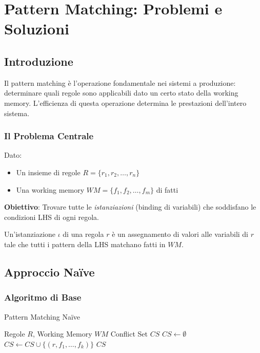 
\chapter{Pattern Matching: Problemi e Soluzioni}
\label{cap:pattern_matching}

\section{Introduzione}

Il pattern matching è l'operazione fondamentale nei sistemi a produzione: determinare quali regole sono applicabili dato un certo stato della working memory. L'efficienza di questa operazione determina le prestazioni dell'intero sistema.

\subsection{Il Problema Centrale}

Dato:
\begin{itemize}
\item Un insieme di regole $R = \{r_1, r_2, \ldots, r_n\}$
\item Una working memory $WM = \{f_1, f_2, \ldots, f_m\}$ di fatti
\end{itemize}

\textbf{Obiettivo}: Trovare tutte le \textit{istanziazioni} (binding di variabili) che soddisfano le condizioni LHS di ogni regola.

\begin{definizione}[Istanziazione]
Un'istanziazione $\iota$ di una regola $r$ è un assegnamento di valori alle variabili di $r$ tale che tutti i pattern della LHS matchano fatti in $WM$.
\end{definizione}

\section{Approccio Naïve}

\subsection{Algoritmo di Base}

\begin{algorithm}
\caption{Pattern Matching Naïve}
\begin{algorithmic}[1]
\Require Regole $R$, Working Memory $WM$
\Ensure Conflict Set $CS$
  \State $CS \gets \emptyset$
        \State $CS \gets CS \cup \{(r, f_1, \ldots, f_k)\}$
      \EndIf
    \EndFor
  \EndFor
  \State \Return $CS$
\EndFunction
\end{algorithmic}
\end{algorithm}

